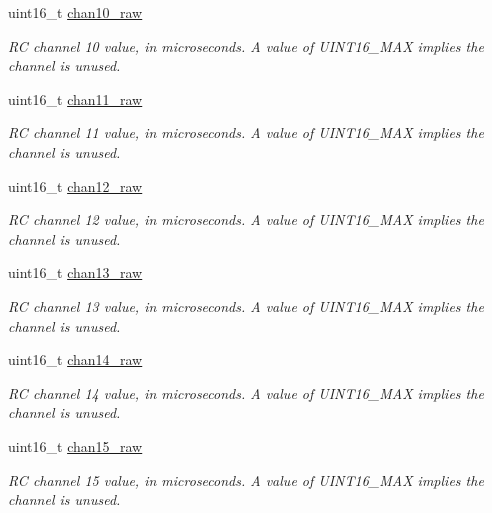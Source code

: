 \begin{DoxyCompactItemize}
uint16\+\_\+t \hyperlink{struct____mavlink__rc__channels__t_a96b3e25a62c6750e5fb5f48af2215c13}{chan10\+\_\+raw}
\begin{DoxyCompactList}\small\item\em R\+C channel 10 value, in microseconds. A value of U\+I\+N\+T16\+\_\+\+M\+A\+X implies the channel is unused. \end{DoxyCompactList}\item 
uint16\+\_\+t \hyperlink{struct____mavlink__rc__channels__t_aa472d84cf1f4a45ea456497919538910}{chan11\+\_\+raw}
\begin{DoxyCompactList}\small\item\em R\+C channel 11 value, in microseconds. A value of U\+I\+N\+T16\+\_\+\+M\+A\+X implies the channel is unused. \end{DoxyCompactList}\item 
uint16\+\_\+t \hyperlink{struct____mavlink__rc__channels__t_a9d738f5aba2e79ab747daf3bf937b2a2}{chan12\+\_\+raw}
\begin{DoxyCompactList}\small\item\em R\+C channel 12 value, in microseconds. A value of U\+I\+N\+T16\+\_\+\+M\+A\+X implies the channel is unused. \end{DoxyCompactList}\item 
uint16\+\_\+t \hyperlink{struct____mavlink__rc__channels__t_a378625790bec2c632fa4d372ae25dd20}{chan13\+\_\+raw}
\begin{DoxyCompactList}\small\item\em R\+C channel 13 value, in microseconds. A value of U\+I\+N\+T16\+\_\+\+M\+A\+X implies the channel is unused. \end{DoxyCompactList}\item 
uint16\+\_\+t \hyperlink{struct____mavlink__rc__channels__t_ad44a334e66c03dc754b687a214455bb4}{chan14\+\_\+raw}
\begin{DoxyCompactList}\small\item\em R\+C channel 14 value, in microseconds. A value of U\+I\+N\+T16\+\_\+\+M\+A\+X implies the channel is unused. \end{DoxyCompactList}\item 
uint16\+\_\+t \hyperlink{struct____mavlink__rc__channels__t_aecba5d673ecb36bd0978b9da0550e87c}{chan15\+\_\+raw}
\begin{DoxyCompactList}\small\item\em R\+C channel 15 value, in microseconds. A value of U\+I\+N\+T16\+\_\+\+M\+A\+X implies the channel is unused. \end{DoxyCompactList}\item 

\end{DoxyCompactItemize}
